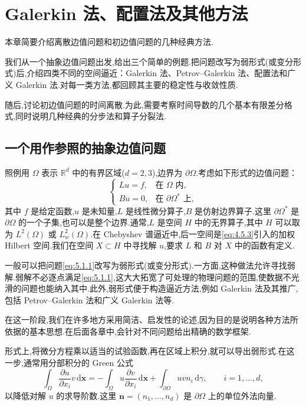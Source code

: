 \chapter{Galerkin 法、配置法及其他方法}\label{ch:5}

本章简要介绍离散边值问题和初边值问题的几种经典方法.

我们从一个抽象边值问题出发,给出三个简单的例题.把问题改写为弱形式(或变分形式)后,介绍四类不同的空间逼近：Galerkin 法、Petrov--Galerkin 法、配置法和广义 Galerkin 法.对每一类方法,都回顾其主要的稳定性与收敛性质.

随后,讨论初边值问题的时间离散.为此,需要考察时间导数的几个基本有限差分格式,同时说明几种经典的分步法和算子分裂法.

\section{一个用作参照的抽象边值问题}\label{sec:5.1}

照例用 \(\Omega\) 表示 \(\mathbb R^d\) 中的有界区域(\(d=2,3\)),边界为 \(\partial\Omega\).考虑如下形式的边值问题：
\begin{equation}\label{eq:5.1.1}
  \begin{cases}
    Lu=f,&\text{在 }\Omega\text{ 内},\\
    Bu=0,&\text{在 }\partial\Omega^*\text{ 上},
  \end{cases}
\end{equation}
其中 \(f\) 是给定函数,\(u\) 是未知量,\(L\) 是线性微分算子,\(B\) 是仿射边界算子.这里 \(\partial\Omega^*\) 是 \(\partial\Omega\) 的一个子集,也可以是整个边界.通常,\(L\) 是空间 \(H\) 中的无界算子,其中 \(H\) 可以取为 \(L^2(\Omega)\) 或 \(L_w^2(\Omega)\).在 Chebyshev 谱逼近中,后一空间是\eqref{eq:4.5.3}引入的加权 Hilbert 空间.我们在空间 \(X\subset H\) 中寻找解 \(u\),要求 \(L\) 和 \(B\) 对 \(X\) 中的函数有定义.

一般可以把问题\eqref{eq:5.1.1}改写为弱形式(或变分形式).一方面,这种做法允许寻找弱解.弱解不必逐点满足\eqref{eq:5.1.1},这大大拓宽了可处理的物理问题的范围,使数据不光滑的问题也能纳入其中.此外,弱形式便于构造逼近方法,例如 Galerkin 法及其推广,包括 Petrov--Galerkin 法和广义 Galerkin 法等.

在这一阶段,我们在许多地方采用简洁、启发性的论述,因为目的是说明各种方法所依据的基本思想.在后面各章中,会针对不同问题给出精确的数学框架.

形式上,将微分方程乘以适当的试验函数,再在区域上积分,就可以导出弱形式.在这一步,通常用分部积分的 Green 公式
\begin{equation}\label{eq:5.1.2}
  \int_\Omega\frac{\partial u}{\partial x_i}v\,\mathrm d\boldsymbol{x}
  =-\int_\Omega u\frac{\partial v}{\partial x_i}\,\mathrm d\boldsymbol{x}
    +\int_{\partial\Omega}uvn_i\,\mathrm d\gamma,\qquad i=1,\ldots,d,
\end{equation}
以降低对解 \(u\) 的求导阶数.这里 \(\boldsymbol{n}=(n_1,\ldots,n_d)\) 是 \(\partial\Omega\) 上的单位外法向量.

